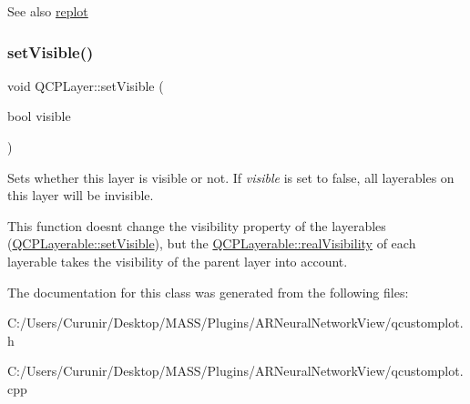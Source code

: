 \begin{DoxySeeAlso}{See also}
\hyperlink{class_q_c_p_layer_adefd53b6db02f470151c416f42e37180}{replot} 
\end{DoxySeeAlso}
\mbox{\label{class_q_c_p_layer_ac07671f74edf6884b51a82afb2c19516}} 
\subsubsection{\texorpdfstring{set\+Visible()}{setVisible()}}
{\footnotesize\ttfamily void Q\+C\+P\+Layer\+::set\+Visible (\begin{DoxyParamCaption}\item[{bool}]{visible }\end{DoxyParamCaption})}

Sets whether this layer is visible or not. If {\itshape visible} is set to false, all layerables on this layer will be invisible.

This function doesn\textquotesingle{}t change the visibility property of the layerables (\hyperlink{class_q_c_p_layerable_a3bed99ddc396b48ce3ebfdc0418744f8}{Q\+C\+P\+Layerable\+::set\+Visible}), but the \hyperlink{class_q_c_p_layerable_ab054e88f15d485defcb95e7376f119e7}{Q\+C\+P\+Layerable\+::real\+Visibility} of each layerable takes the visibility of the parent layer into account. 

The documentation for this class was generated from the following files\+:\begin{DoxyCompactItemize}
\item 
C\+:/\+Users/\+Curunir/\+Desktop/\+M\+A\+S\+S/\+Plugins/\+A\+R\+Neural\+Network\+View/qcustomplot.\+h\item 
C\+:/\+Users/\+Curunir/\+Desktop/\+M\+A\+S\+S/\+Plugins/\+A\+R\+Neural\+Network\+View/qcustomplot.\+cpp\end{DoxyCompactItemize}
